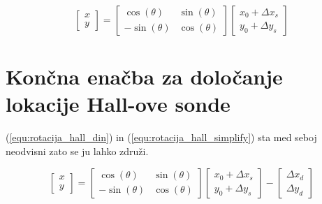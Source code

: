 \begin{equation}
\label{equ:rotacija_hall_stat}
\begin{bmatrix} x\\y \end{bmatrix}=
\begin{bmatrix} \cos(\theta)&\sin(\theta)\\-\sin(\theta)&\cos(\theta) \end{bmatrix}
\begin{bmatrix} x_0+\Delta x_s\\y_0+\Delta y_s \end{bmatrix}
\end{equation}







\section{Končna enačba za določanje lokacije Hall-ove sonde}


(\ref{equ:rotacija_hall_din}) in (\ref{equ:rotacija_hall_simplify}) sta med seboj neodvisni zato se ju lahko združi.

\begin{equation}
\label{equ:rotacija_hall_koncna}
\begin{bmatrix} x\\y \end{bmatrix}=
\begin{bmatrix} \cos(\theta)&\sin(\theta)\\-\sin(\theta)&\cos(\theta) \end{bmatrix}
\begin{bmatrix} x_0+\Delta x_s\\y_0+\Delta y_s \end{bmatrix}-
\begin{bmatrix} \Delta x_d\\\Delta y_d \end{bmatrix}
\end{equation}


